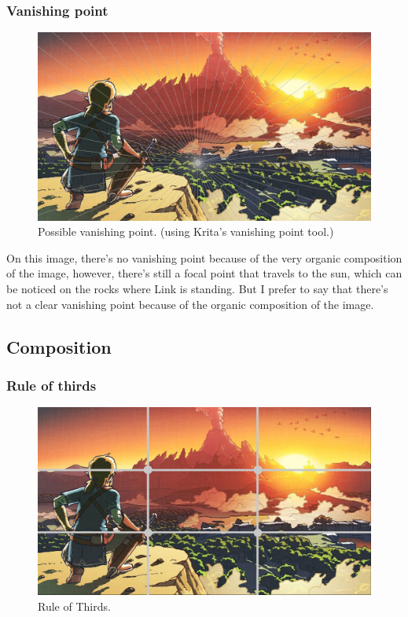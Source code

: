 \documentclass{cup-pan}
\begin{document}
            \subsubsection{Vanishing point}
                \begin{figure}[H]
                    \includegraphics[width=\textwidth]{Imagenes/Referencias/Analisis_ConceptArt/posiblepuntofuga.png}
                    \caption{Possible vanishing point. (using Krita's vanishing point tool.)}
                \end{figure}
                On this image, there's no vanishing point because of the very organic composition of the image, however, there's still a focal point that travels to the sun, which can be noticed on the rocks where Link is standing. 
                But I prefer to say that there's not a clear vanishing point because of the organic composition of the image.
        \newpage
        \subsection{Composition}
            \subsubsection{Rule of thirds}
                \begin{figure}[H]
                    \includegraphics[width=\textwidth]{Imagenes/Referencias/Analisis_ConceptArt/tercios.png}
                    \caption{Rule of Thirds.}
                \end{figure}
\end{document}
